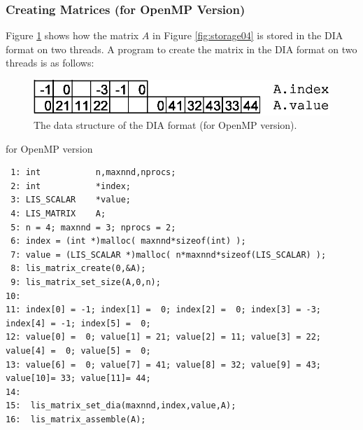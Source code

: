 \documentclass[a4paper]{article}
\begin{document}
\subsubsection{Creating Matrices (for OpenMP Version)}
Figure \ref{fig:storage04_omp} shows how the matrix $A$ in Figure \ref{fig:storage04} is stored in the DIA format on two threads. A program to create the matrix in the DIA format on two threads is as follows:
\begin{figure}[h]
{\centering 
\includegraphics{storage04_omp.eps} 
\caption{The data structure of the DIA format (for OpenMP version).}\label{fig:storage04_omp}}
\end{figure}
\begin{itembox}[l]{for OpenMP version}
\small
\begin{verbatim}
 1: int           n,maxnnd,nprocs;
 2: int           *index;
 3: LIS_SCALAR    *value;
 4: LIS_MATRIX    A;
 5: n = 4; maxnnd = 3; nprocs = 2;
 6: index = (int *)malloc( maxnnd*sizeof(int) );
 7: value = (LIS_SCALAR *)malloc( n*maxnnd*sizeof(LIS_SCALAR) );
 8: lis_matrix_create(0,&A);
 9: lis_matrix_set_size(A,0,n);
10:
11: index[0] = -1; index[1] =  0; index[2] =  0; index[3] = -3; index[4] = -1; index[5] =  0;
12: value[0] =  0; value[1] = 21; value[2] = 11; value[3] = 22; value[4] =  0; value[5] =  0;
13: value[6] =  0; value[7] = 41; value[8] = 32; value[9] = 43; value[10]= 33; value[11]= 44;
14:
15:  lis_matrix_set_dia(maxnnd,index,value,A);
16:  lis_matrix_assemble(A);
\end{verbatim}
\end{itembox}
\newpage
\end{document}
